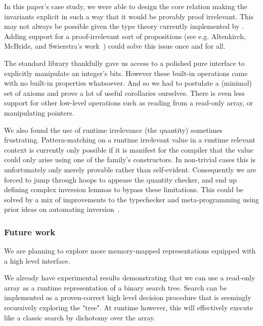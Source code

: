 In this paper's case study, we were able to design the core 
relation making the invariants explicit in such a way that it would be provably
proof irrelevant.
%
This may not always be possible given the type theory currently implemented by
\idris{}. Adding support for a proof-irrelevant sort of propositions (see e.g.
Altenkirch, McBride, and Swierstra's work~\cite{DBLP:conf/plpv/AltenkirchMS07})
could solve this issue once and for all.

The \idris{} standard library thankfully gave us access to a polished pure interface
to explicitly manipulate an integer's bits.
%
However these built-in operations came with no built-in properties whatsoever.
%
And so we had to postulate a (minimal) set of axioms
\iftoggle{APPENDIX}{(see \cref{appendix:postulated})}{}
and prove a lot of useful corollaries ourselves.
%
There is even less support for other low-level operations such as reading from
a read-only array, or manipulating pointers.

We also found the use of runtime irrelevance (the  quantity)
sometimes frustrating.
%
Pattern-matching on a runtime irrelevant value in a runtime relevant context
is currently only possible if it is manifest for the compiler that the value
could only arise using one of the family's constructors.
%
In non-trivial cases this is unfortunately only merely provable rather than
self-evident.
%
Consequently we are forced to jump through hoops to appease the quantity
checker, and end up defining complex inversion lemmas to bypass these
limitations.
%
This could be solved by a mix of improvements to the typechecker and
meta-programming using prior ideas on automating
inversion~\cite{DBLP:conf/types/CornesT95,DBLP:conf/types/McBride96,monin:inria-00489412}.

\subsubsection{Future work}

We are planning to explore more memory-mapped representations equipped with a high
level interface.

We already have experimental results demonstrating that we can use a read-only array
as a runtime representation of a binary search tree.
%
Search can be implemented as a proven-correct high level decision procedure that
is seemingly recursively exploring the "tree".
%
At runtime however, this will effectively execute like a classic search by dichotomy
over the array.

